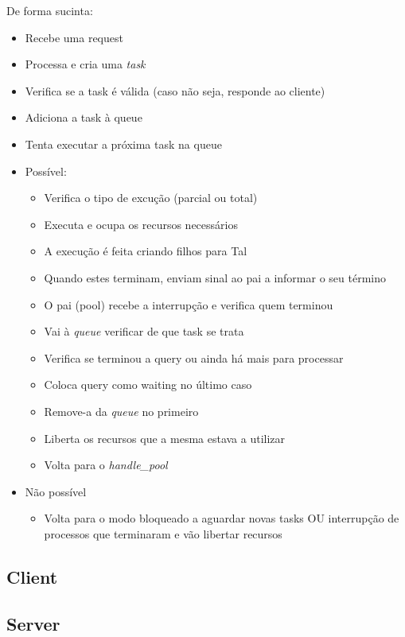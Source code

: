 \documentclass{article}
\begin{document}
De forma sucinta:
\begin{itemize}
    \item Recebe uma request
    \item Processa e cria uma \textit{task}
    \item Verifica se a task é válida (caso não seja, responde ao cliente)
    \item Adiciona a task à queue
    \item Tenta executar a próxima task na queue
    \item Possível:
          \begin{itemize}
              \item Verifica o tipo de excução (parcial ou total)
              \item Executa e ocupa os recursos necessários
              \item A execução é feita criando filhos para Tal
              \item Quando estes terminam, enviam sinal ao pai a informar o seu término
              \item O pai (pool) recebe a interrupção e verifica quem terminou
              \item Vai à \textit{queue} verificar de que task se trata
              \item Verifica se terminou a query ou ainda há mais para processar
              \item Coloca query como waiting no último caso
              \item Remove-a da \textit{queue} no primeiro
              \item Liberta os recursos que a mesma estava a utilizar
              \item Volta para o \textit{handle\_pool}
          \end{itemize}
    \item Não possível
          \begin{itemize}
              \item Volta para o modo bloqueado a aguardar novas tasks OU interrupção de processos que terminaram e vão libertar recursos
          \end{itemize}
\end{itemize}

\subsection{Client}


\subsection{Server}
\end{document}

